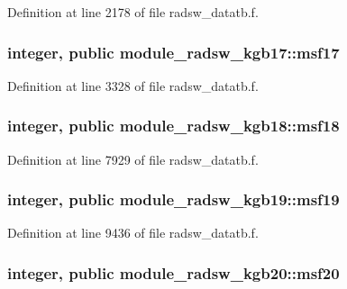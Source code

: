 Definition at line 2178 of file radsw\+\_\+datatb.\+f.

\subsubsection[{\texorpdfstring{msf17}{msf17}}]{\setlength{\rightskip}{0pt plus 5cm}integer, public module\+\_\+radsw\+\_\+kgb17\+::msf17}\hypertarget{group__module__radsw__main_ga6864c3b95515fb2f408e21298da3952f}{}\label{group__module__radsw__main_ga6864c3b95515fb2f408e21298da3952f}


Definition at line 3328 of file radsw\+\_\+datatb.\+f.

\subsubsection[{\texorpdfstring{msf18}{msf18}}]{\setlength{\rightskip}{0pt plus 5cm}integer, public module\+\_\+radsw\+\_\+kgb18\+::msf18}\hypertarget{group__module__radsw__main_ga1d74002f71710887e45df89d3897a10a}{}\label{group__module__radsw__main_ga1d74002f71710887e45df89d3897a10a}


Definition at line 7929 of file radsw\+\_\+datatb.\+f.

\subsubsection[{\texorpdfstring{msf19}{msf19}}]{\setlength{\rightskip}{0pt plus 5cm}integer, public module\+\_\+radsw\+\_\+kgb19\+::msf19}\hypertarget{group__module__radsw__main_ga86778b12ff439f4f83fda891e7ae2bfe}{}\label{group__module__radsw__main_ga86778b12ff439f4f83fda891e7ae2bfe}


Definition at line 9436 of file radsw\+\_\+datatb.\+f.

\subsubsection[{\texorpdfstring{msf20}{msf20}}]{\setlength{\rightskip}{0pt plus 5cm}integer, public module\+\_\+radsw\+\_\+kgb20\+::msf20}\hypertarget{group__module__radsw__main_ga925dc2da02eef4edcf000a14525a7c7e}{}\label{group__module__radsw__main_ga925dc2da02eef4edcf000a14525a7c7e}


